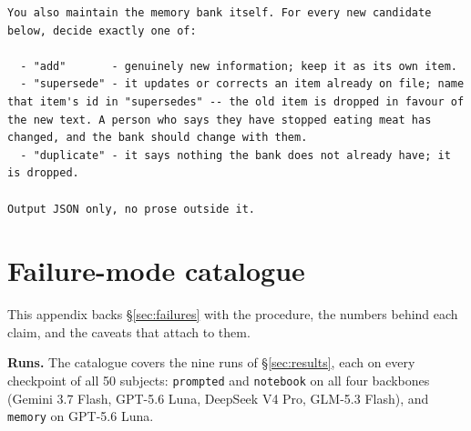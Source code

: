 \documentclass{article}
\begin{document}
{\begin{lstlisting}
You also maintain the memory bank itself. For every new candidate below, decide exactly one of:

  - "add"       - genuinely new information; keep it as its own item.
  - "supersede" - it updates or corrects an item already on file; name that item's id in "supersedes" -- the old item is dropped in favour of the new text. A person who says they have stopped eating meat has changed, and the bank should change with them.
  - "duplicate" - it says nothing the bank does not already have; it is dropped.

Output JSON only, no prose outside it.
\end{lstlisting}}

\section{Failure-mode catalogue}
\label{app:failures}

This appendix backs \S\ref{sec:failures} with the procedure, the numbers behind each claim, and the
caveats that attach to them.

\textbf{Runs.} The catalogue covers the nine runs of \S\ref{sec:results}, each on every
checkpoint of all 50 subjects: \texttt{prompted} and \texttt{notebook} on all four backbones
(Gemini 3.7 Flash, GPT-5.6 Luna, DeepSeek V4 Pro, GLM-5.3 Flash), and \texttt{memory} on
GPT-5.6 Luna.
\end{document}
